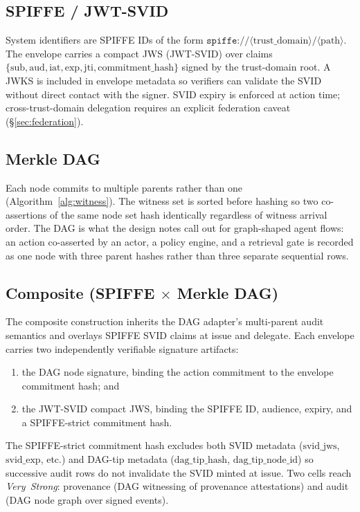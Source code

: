 \documentclass[11pt,a4paper]{article}
\begin{document}
\subsection{SPIFFE / JWT-SVID}\label{sec:spiffe}

System identifiers are SPIFFE IDs of the form
$\texttt{spiffe://}\langle\text{trust\_domain}\rangle/\langle\text{path}\rangle$.
The envelope carries a compact JWS (JWT-SVID) over claims
$\{\text{sub}, \text{aud}, \text{iat}, \text{exp}, \text{jti},
\text{commitment\_hash}\}$ signed by the trust-domain root. A JWKS is
included in envelope metadata so verifiers can validate the SVID without
direct contact with the signer. SVID expiry is enforced at action time;
cross-trust-domain delegation requires an explicit federation caveat
(\S\ref{sec:federation}).

\subsection{Merkle DAG}\label{sec:dag}

Each node commits to multiple parents rather than one
(Algorithm~\ref{alg:witness}). The witness set is sorted before hashing
so two co-assertions of the same node set hash identically regardless of
witness arrival order. The DAG is what the design notes call out for
graph-shaped agent flows: an action co-asserted by an actor, a policy
engine, and a retrieval gate is recorded as one node with three parent
hashes rather than three separate sequential rows.

\subsection{Composite (SPIFFE $\times$ Merkle DAG)}\label{sec:composite}

The composite construction inherits the DAG adapter's multi-parent audit
semantics and overlays SPIFFE SVID claims at issue and delegate. Each
envelope carries two independently verifiable signature artifacts:
\begin{enumerate}[leftmargin=*,nosep]
  \item the DAG node signature, binding the action commitment to the
    envelope commitment hash; and
  \item the JWT-SVID compact JWS, binding the SPIFFE ID, audience,
    expiry, and a SPIFFE-strict commitment hash.
\end{enumerate}
The SPIFFE-strict commitment hash excludes both SVID metadata
($\text{svid\_jws}$, $\text{svid\_exp}$, etc.) and DAG-tip metadata
($\text{dag\_tip\_hash}$, $\text{dag\_tip\_node\_id}$) so successive
audit rows do not invalidate the SVID minted at issue. Two cells reach
\emph{Very~Strong}: provenance (DAG witnessing of provenance attestations)
and audit (DAG node graph over signed events).
\end{document}
